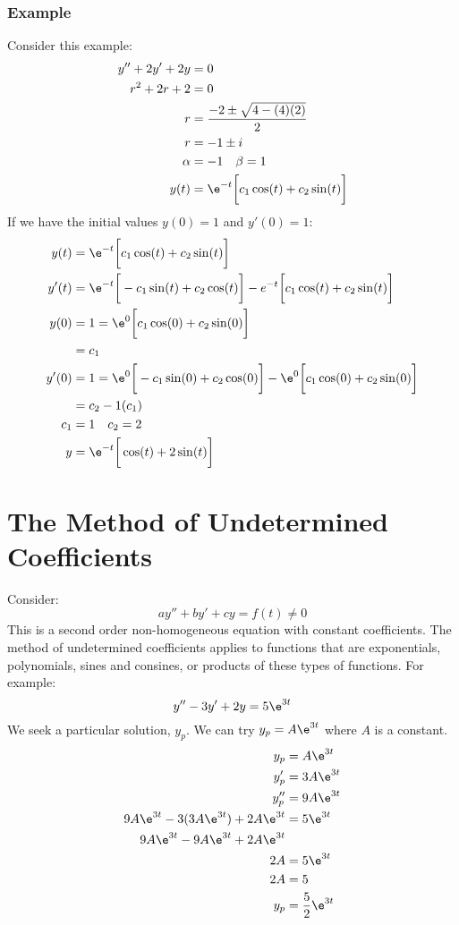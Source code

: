 \documentclass{math}
\begin{document}
\subsubsection*{Example}
Consider this example:
\begin{align*}
  y''+2y'+2y &= 0 \\
  r^2+2r+2 &= 0 \\
  r &= \frac{-2\pm\sqrt{4-(4)(2)}}{2} \\
  r &= -1\pm i \\
  \alpha &= -1 \quad \beta = 1 \\
  y(t) &= \e^{-t}\bigg[c_1\cos(t)+c_2\sin(t)\bigg]
\end{align*}
If we have the initial values \( y(0) = 1 \) and \( y'(0) = 1 \):
\begin{align*}
  y(t) &= \e^{-t}\bigg[c_1\cos(t)+c_2\sin(t)\bigg] \\
  y'(t) &= \e^{-t}\bigg[-c_1\sin(t)+c_2\cos(t)\bigg]-
    e^{-t}\bigg[c_1\cos(t)+c_2\sin(t)\bigg] \\
  y(0) &= 1 = \e^{0}\bigg[c_1\cos(0)+c_2\sin(0)\bigg] \\
  &= c_1 \\
  y'(0) &= 1 = \e^{0}\bigg[-c_1\sin(0)+c_2\cos(0)\bigg]-
    \e^{0}\bigg[c_1\cos(0)+c_2\sin(0)\bigg] \\
  &= c_2-1(c_1) \\
  c_1 &= 1 \quad c_2 = 2 \\
  y &= \e^{-t}\bigg[\cos(t)+2\sin(t)\bigg]
\end{align*}

\clearpage
\section*{The Method of Undetermined Coefficients}
Consider:
\[ ay''+by'+cy = f(t) \ne 0 \]
This is a second order non-homogeneous equation with constant coefficients. The
method of undetermined coefficients applies to functions that are exponentials,
polynomials, sines and consines, or products of these types of functions. For
example:
\[ y''-3y'+2y = 5\e^{3t} \]
We seek a particular solution, \( y_p \). We can try \( y_p = A\e^{3t} \) where
\( A \) is a constant.
\begin{align*}
  y_p &= A\e^{3t} \\
  y_p' &= 3A\e^{3t} \\
  y_p'' &= 9A\e^{3t} \\
  9A\e^{3t}-3(3A\e^{3t})+2A\e^{3t} &= 5\e^{3t} \\
  9A\e^{3t}-9A\e^{3t}+2A\e^{3t} \\
  2A &= 5\e^{3t} \\
  2A &= 5 \\
  y_p &= \frac{5}{2}\e^{3t}
\end{align*}
\end{document}

